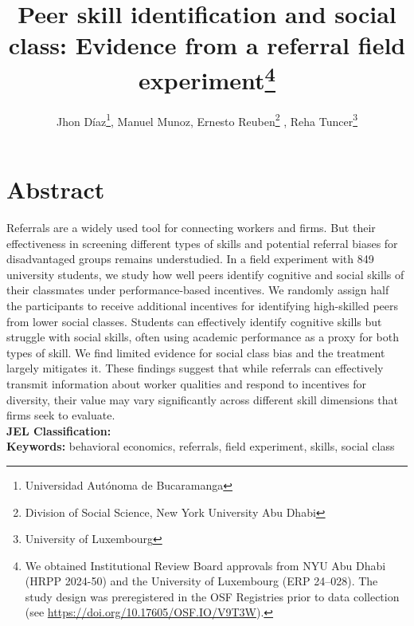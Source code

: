 \documentclass[11pt,a4paper,oneside]{article}
\title{Peer skill identification and social class:
Evidence from a referral field experiment\footnote{We obtained Institutional Review Board approvals from NYU Abu Dhabi (HRPP 2024-50) and the University of Luxembourg (ERP 24–028). The study design was preregistered in the OSF Registries prior to data collection (see \url{https://doi.org/10.17605/OSF.IO/V9T3W}).} }
\author{Jhon Díaz\footnote{Universidad Autónoma de Bucaramanga}, Manuel Munoz\footremember{liser}{Luxembourg Institute of Socio-Economic Research}, Ernesto Reuben\footnote{Division of Social Science, New York University Abu Dhabi} \footrecall{liser}, Reha Tuncer\footnote{University of Luxembourg}}
\begin{document}
\maketitle



\section*{Abstract}
Referrals are a widely used tool for connecting workers and firms. But their effectiveness in screening different types of skills and potential referral biases for disadvantaged groups remains understudied. In a field experiment with 849 university students, we study how well peers identify cognitive and social skills of their classmates under performance-based incentives. We randomly assign half the participants to receive additional incentives for identifying high-skilled peers from lower social classes. Students can effectively identify cognitive skills but struggle with social skills, often using academic performance as a proxy for both types of skill. We find limited evidence for social class bias and the treatment largely mitigates it. These findings suggest that while referrals can effectively transmit information about worker qualities and respond to incentives for diversity, their value may vary significantly across different skill dimensions that firms seek to evaluate.
\medskip \\
\textbf{JEL Classification:} \\
\textbf{Keywords:} behavioral economics, referrals, field experiment, skills, social class

\end{document}
